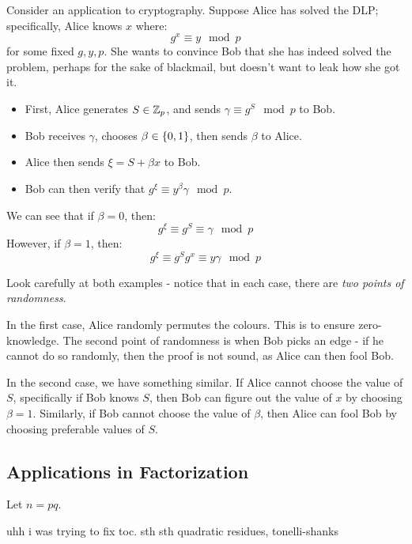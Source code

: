 \documentclass{article}
\begin{document}
Consider an application to cryptography.
Suppose Alice has solved the DLP; specifically, Alice knows $ x $ where:
\begin{equation*}
    g^{x} \equiv y \mod p
\end{equation*}
for some fixed $ g, y, p $.
She wants to convince Bob that she has indeed solved the problem,
perhaps for the sake of blackmail, but doesn't want to leak how she got it.
\begin{itemize}
    \item First, Alice generates $ S \in \mathbb{Z}_{p} $,
        and sends $ \gamma \equiv g^{S} \mod p $ to Bob.
    \item Bob receives $ \gamma $, chooses $ \beta \in \left\{{0, 1}\right\} $,
        then sends $ \beta $ to Alice.
    \item Alice then sends $ \xi = S + \beta x $ to Bob.
    \item Bob can then verify that $ g^{\xi} \equiv y^{\beta}\gamma \mod p $.
\end{itemize}
We can see that if $ \beta = 0 $, then:
\begin{equation*}
    g^{\xi} \equiv g^{S} \equiv \gamma \mod p
\end{equation*}
However, if $ \beta = 1 $, then:
\begin{equation*}
    g^{\xi} \equiv g^{S}g^{x} \equiv y\gamma \mod p
\end{equation*}

Look carefully at both examples - notice that in each case,
there are \textit{two points of randomness}.

In the first case, Alice randomly permutes the colours. This is to ensure zero-knowledge.
The second point of randomness is when Bob picks an edge - if he cannot do so randomly,
then the proof is not sound, as Alice can then fool Bob.

In the second case, we have something similar.
If Alice cannot choose the value of $ S $, specifically if Bob knows $ S $,
then Bob can figure out the value of $ x $ by choosing $ \beta = 1 $.
Similarly, if Bob cannot choose the value of $ \beta $, then Alice can fool Bob by
choosing preferable values of $ S $.

\subsection{Applications in Factorization}

Let $ n = pq $.

uhh i was trying to fix toc. sth sth quadratic residues, tonelli-shanks
\end{document}
